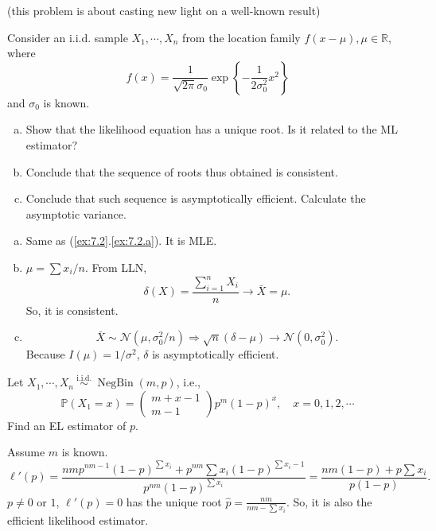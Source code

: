 \begin{ex}
    (this problem is about casting new light on a well-known result) 

    Consider an i.i.d. sample \(X_{1}, \cdots, X_{n}\) from the location family \(f(x-\mu), \mu \in \mathbb{R}\), where
    \[
        f(x)=\frac{1}{\sqrt{2 \pi} \sigma_{0}} \exp \left\{-\frac{1}{2 \sigma_{0}^{2}} x^{2}\right\}
    \]
    and \(\sigma_{0}\) is known. 
    \begin{enumerate}[(a)]
        \item Show that the likelihood equation has a unique root. Is it related to the ML estimator? 
        \item Conclude that the sequence of roots thus obtained is consistent. 
        \item Conclude that such sequence is asymptotically efficient. Calculate the asymptotic variance. 
    \end{enumerate}
\end{ex}

\begin{solution}
    \begin{enumerate}[(a)]
        \item Same as (\ref{ex:7.2}.\ref{ex:7.2.a}). It is MLE. 
        \item $\mu=\sum x_i/n$. From LLN, 
        \[
            \delta(X)=\frac{\sum_{i=1}^nX_i}{n}\to\bar{X}=\mu. 
        \]
        So, it is consistent. 
        \item \[
            \bar{X}\sim\mathcal{N}(\mu,\sigma_0^2/n)\Rightarrow\sqrt{n}(\delta-\mu)\to \mathcal{N}\left(0, \sigma_0^2\right). 
        \]
        Because $I(\mu)=1/\sigma^2$, $\delta$ is asymptotically efficient. 
    \end{enumerate}
\end{solution}

\begin{ex}
    Let \(X_{1}, \cdots, X_{n} \stackrel{\text { i.i.d. }}{\sim} \operatorname{NegBin}(m, p)\), i.e.,
    \[
        \mathbb{P}\left(X_{1}=x\right)=\left(\begin{array}{c}
        m+x-1 \\
        m-1
        \end{array}\right) p^{m}(1-p)^{x}, \quad x=0,1,2, \cdots
    \]
    Find an EL estimator of \(p\). 
\end{ex}

\begin{solution}
    Assume $m$ is known. 
    \[
        \ell'(p)=\frac{nmp^{nm-1}(1-p)^{\sum x_i}+p^{nm}\sum x_i(1-p)^{\sum x_i-1}}{p^{nm}(1-p)^{\sum x_i}}=\frac{nm(1-p)+p\sum x_i}{p(1-p)}.
    \]
    $p\neq 0$ or $1$, $\ell'(p)=0$ has the unique root $\hat{p}=\frac{nm}{nm-\sum x_i}$. So, it is also the efficient likelihood estimator. 
\end{solution}

